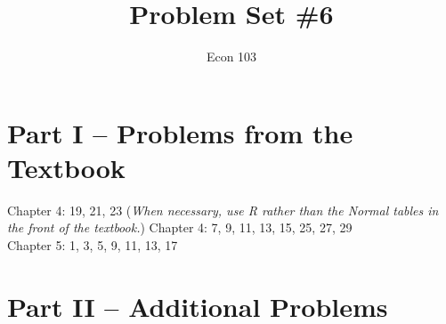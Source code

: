 \documentclass[addpoints,12pt]{exam}
\title{Problem Set \#6}
\author{Econ 103}
\date{}
\begin{document}
\maketitle


\section*{Part I -- Problems from the Textbook}
Chapter 4: 19, 21, 23
(\emph{When necessary, use R rather than the Normal tables in the front of the textbook.})
Chapter 4: 7, 9, 11, 13, 15, 25, 27, 29\\
Chapter 5: 1, 3, 5, 9, 11, 13, 17




\section*{Part II -- Additional Problems}
\end{document}
